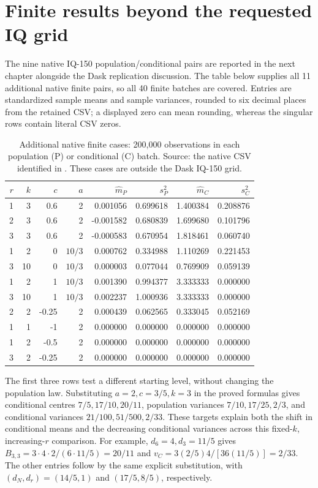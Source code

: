 \section{Finite results beyond the requested IQ grid}
The nine native IQ-150 population/conditional pairs are reported in the
next chapter alongside the Dask replication discussion. The table below
supplies all 11 additional native finite pairs, so all 40 finite batches
are covered. Entries are standardized sample means and sample variances,
rounded to six decimal places from the retained CSV; a displayed zero
can mean rounding, whereas the singular rows contain literal CSV zeros.

\begin{table}[htbp]
\centering\small
\setlength{\tabcolsep}{4pt}
\begin{tabular}{rrrrrrrr}
\toprule
\(r\)&\(k\)&\(c\)&\(a\)&\(\widehat m_P\)&\(s_P^2\)&\(\widehat m_C\)&\(s_C^2\)\\
\midrule
1&3&0.6&2&0.001056&0.699618&1.400384&0.208876\\
2&3&0.6&2&-0.001582&0.680839&1.699680&0.101796\\
3&3&0.6&2&-0.000583&0.670954&1.818461&0.060740\\
1&2&0&\(10/3\)&0.000762&0.334988&1.110269&0.221453\\
3&10&0&\(10/3\)&0.000003&0.077044&0.769909&0.059139\\
1&2&1&\(10/3\)&0.001390&0.994377&3.333333&0.000000\\
3&10&1&\(10/3\)&0.002237&1.000936&3.333333&0.000000\\
2&2&-0.25&2&0.000439&0.062565&0.333045&0.052169\\
1&1&-1&2&0.000000&0.000000&0.000000&0.000000\\
1&2&-0.5&2&0.000000&0.000000&0.000000&0.000000\\
3&2&-0.25&2&0.000000&0.000000&0.000000&0.000000\\
\bottomrule
\end{tabular}
\caption{Additional native finite cases: 200,000 observations in each
population (P) or conditional (C) batch. Source: the native CSV identified
in . These cases are outside the Dask IQ-150 grid.}
\label{tab:seq-native-extra}
\end{table}

The first three rows test a different starting level, without changing
the population law. Substituting \(a=2,c=3/5,k=3\) in the proved
formulas gives conditional centres \(7/5,17/10,20/11\), population
variances \(7/10,17/25,2/3\), and conditional variances
\(21/100,51/500,2/33\). These targets explain both the shift in
conditional means and the decreasing conditional variances across this
fixed-\(k\), increasing-\(r\) comparison. For example,
\(d_6=4,d_3=11/5\) gives
\(B_{3,3}=3\cdot4\cdot2/(6\cdot11/5)=20/11\) and
\(v_C=3(2/5)4/[36(11/5)]=2/33\). The other entries follow by
the same explicit substitution, with \((d_N,d_r)=(14/5,1)\) and
\((17/5,8/5)\), respectively.

